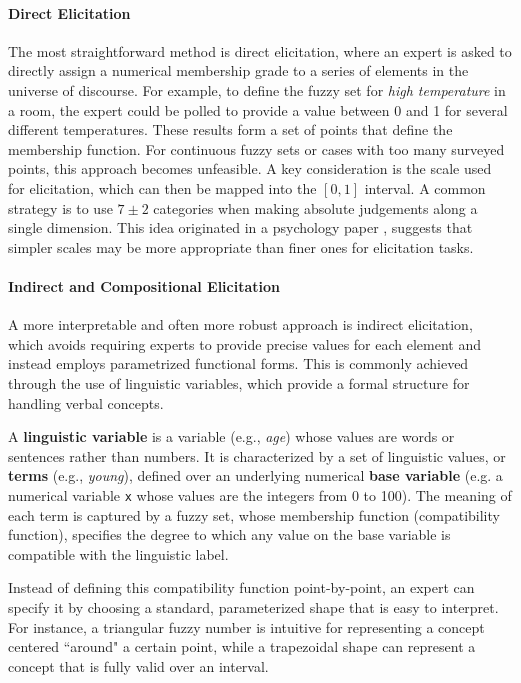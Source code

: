 \paragraph{Direct Elicitation}
The most straightforward method is direct elicitation, where an expert is asked to directly assign a numerical membership grade to a series of elements in the universe of discourse. For example, to define the fuzzy set for \emph{high temperature} in a room, the expert could be polled to provide a value between 0 and 1 for several different temperatures. These results form a set of points that define the membership function. For continuous fuzzy sets or cases with too many surveyed points, this approach becomes unfeasible. A key consideration is the scale used for elicitation, which can then be mapped into the $[0,1]$ interval. A common strategy is to use $7\pm2$ categories when making absolute judgements along a single dimension. This idea originated in a psychology paper \cite{miller1956magical}, suggests that simpler scales may be more appropriate than finer ones for elicitation tasks.

\paragraph{Indirect and Compositional Elicitation}
A more interpretable and often more robust approach is indirect elicitation, which avoids requiring experts to provide precise values for each element and instead employs parametrized functional forms. This is commonly achieved through the use of linguistic variables, which provide a formal structure for handling verbal concepts.

\begin{definition}
A \textbf{linguistic variable} is a variable (e.g., \emph{age}) whose values are words or sentences rather than numbers. It is characterized by a set of linguistic values, or \textbf{terms} (e.g., \emph{young}), defined over an underlying numerical \textbf{base variable} (e.g. a numerical variable \texttt{x} whose values are the integers from 0 to 100). The meaning of each term is captured by a fuzzy set, whose membership function (compatibility function), specifies the degree to which any value on the base variable is compatible with the linguistic label.
\end{definition}

Instead of defining this compatibility function point-by-point, an expert can specify it by choosing a standard, parameterized shape that is easy to interpret. For instance, a triangular fuzzy number is intuitive for representing a concept centered ``around" a certain point, while a trapezoidal shape can represent a concept that is fully valid over an interval. 

